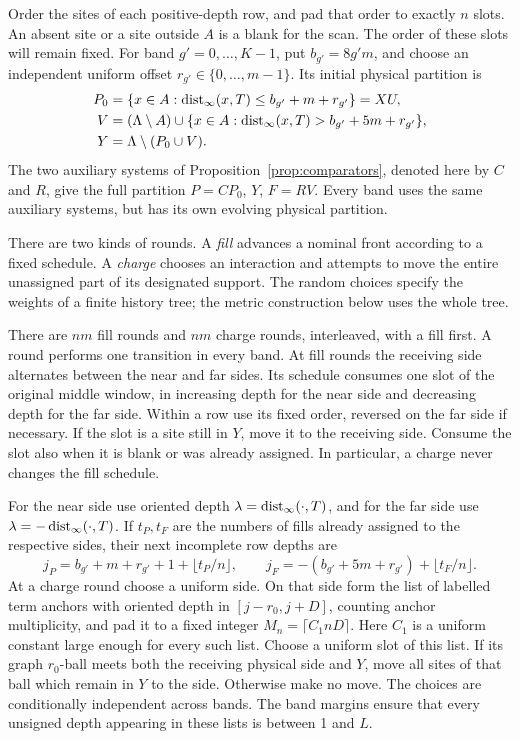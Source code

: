 Order the sites of each positive-depth row, and pad that order to exactly
\(n\) slots.  An absent site or a site outside \(A\) is a blank for
the scan.  The order of these slots will remain fixed.  For band
\(g'=0,\ldots,K-1\), put \(b_{g'}=8g'm\), and choose an independent
uniform offset \(r_{g'}\in\{0,\ldots,m-1\}\).  Its initial physical
partition is
\begin{align*}
 P_0&=\{x\in A:\operatorname{dist}_\infty(x,T)\le b_{g'}+m+r_{g'}\}=XU,\\
 V&=(\Lambda\setminus A)\cup
       \{x\in A:\operatorname{dist}_\infty(x,T)>b_{g'}+5m+r_{g'}\},\\
 Y&=\Lambda\setminus(P_0\cup V).
\end{align*}
The two auxiliary systems of Proposition~\ref{prop:comparators}, denoted
here by \(C\) and \(R\), give the full partition
\(P=CP_0\), \(Y\), \(F=RV\).  Every band uses the same auxiliary
systems, but has its own evolving physical partition.

There are two kinds of rounds.  A \emph{fill} advances a nominal front
according to a fixed schedule.  A \emph{charge} chooses an interaction
and attempts to move the entire unassigned part of its designated support.
The random choices specify the weights of a finite history tree; the
metric construction below uses the whole tree.

There are \(nm\) fill rounds and \(nm\) charge rounds, interleaved,
with a fill first.  A round performs one transition in every band.
At fill rounds the receiving side alternates between the near and far
sides.  Its schedule consumes one slot of the original middle window,
in increasing depth for the near side and decreasing depth for the far
side.  Within a row use its fixed order, reversed on the far side if
necessary.  If the slot is a site still in \(Y\), move it to the
receiving side.  Consume the slot also when it is blank or was already
assigned.  In particular, a charge never changes the fill schedule.

For the near side use oriented depth \(\lambda=\operatorname{dist}_\infty(\cdot,T)\),
and for the far side use \(\lambda=-\operatorname{dist}_\infty(\cdot,T)\).  If
\(t_P,t_F\) are the numbers of fills already assigned to the respective
sides, their next incomplete row depths are
\begin{equation}
 j_P=b_{g'}+m+r_{g'}+1+\lfloor t_P/n\rfloor,
 \qquad
 j_F=-(b_{g'}+5m+r_{g'})+\lfloor t_F/n\rfloor.
 \label{scanner:fronts}
\end{equation}
At a charge round choose a uniform side.  On that side form the list of
labelled term anchors with oriented depth in
\([j-r_0,j+D]\), counting anchor multiplicity, and pad it to a fixed
integer \(M_n=\lceil C_1nD\rceil\).  Here \(C_1\) is a uniform
constant large enough for every such list.  Choose a uniform slot of
this list.  If its graph \(r_0\)-ball meets both the receiving physical
side and \(Y\), move all sites of that ball which remain in \(Y\)
to the side.  Otherwise make no move.  The choices are conditionally
independent across bands.  The band margins ensure that every unsigned
depth appearing in these lists is between 1 and \(L\).

